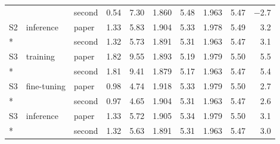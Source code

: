 {\begin{longtable}{lllrrrrrrr}
 &  & second & 0.54 & 7.30 & 1.860 & 5.48 & 1.963 & 5.47 & $-$2.7 \\
S2 & inference & paper & 1.33 & 5.83 & 1.904 & 5.33 & 1.978 & 5.49 & 3.2 \\*
 &  & second & 1.32 & 5.73 & 1.891 & 5.31 & 1.963 & 5.47 & 3.1 \\
\midrule
S3 & training & paper & 1.82 & 9.55 & 1.893 & 5.19 & 1.979 & 5.50 & 5.5 \\*
 &  & second & 1.81 & 9.41 & 1.879 & 5.17 & 1.963 & 5.47 & 5.4 \\
S3 & fine-tuning & paper & 0.98 & 4.74 & 1.918 & 5.33 & 1.979 & 5.50 & 2.7 \\*
 &  & second & 0.97 & 4.65 & 1.904 & 5.31 & 1.963 & 5.47 & 2.6 \\
S3 & inference & paper & 1.33 & 5.72 & 1.905 & 5.34 & 1.979 & 5.50 & 3.1 \\*
 &  & second & 1.32 & 5.63 & 1.891 & 5.31 & 1.963 & 5.47 & 3.0 \\
\bottomrule\end{longtable}}
